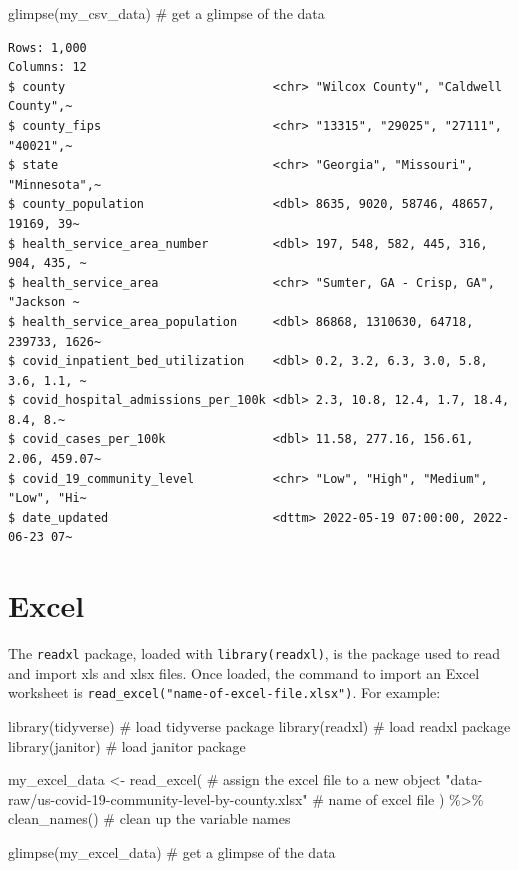 \documentclass[
  letterpaper,
  DIV=11,
  numbers=noendperiod]{scrreprt}
\newenvironment{Shaded}{\begin{snugshade}}{\end{snugshade}}
\newcommand{\CommentTok}[1]{\textcolor[rgb]{0.37,0.37,0.37}{#1}}
\newcommand{\FunctionTok}[1]{\textcolor[rgb]{0.28,0.35,0.67}{#1}}
\newcommand{\NormalTok}[1]{\textcolor[rgb]{0.00,0.23,0.31}{#1}}
\newcommand{\OtherTok}[1]{\textcolor[rgb]{0.00,0.23,0.31}{#1}}
\newcommand{\SpecialCharTok}[1]{\textcolor[rgb]{0.37,0.37,0.37}{#1}}
\newcommand{\StringTok}[1]{\textcolor[rgb]{0.13,0.47,0.30}{#1}}
\begin{document}
\begin{Shaded}
\begin{Highlighting}[]
\FunctionTok{glimpse}\NormalTok{(my\_csv\_data) }\CommentTok{\# get a glimpse of the data }
\end{Highlighting}
\end{Shaded}

\begin{verbatim}
Rows: 1,000
Columns: 12
$ county                             <chr> "Wilcox County", "Caldwell County",~
$ county_fips                        <chr> "13315", "29025", "27111", "40021",~
$ state                              <chr> "Georgia", "Missouri", "Minnesota",~
$ county_population                  <dbl> 8635, 9020, 58746, 48657, 19169, 39~
$ health_service_area_number         <dbl> 197, 548, 582, 445, 316, 904, 435, ~
$ health_service_area                <chr> "Sumter, GA - Crisp, GA", "Jackson ~
$ health_service_area_population     <dbl> 86868, 1310630, 64718, 239733, 1626~
$ covid_inpatient_bed_utilization    <dbl> 0.2, 3.2, 6.3, 3.0, 5.8, 3.6, 1.1, ~
$ covid_hospital_admissions_per_100k <dbl> 2.3, 10.8, 12.4, 1.7, 18.4, 8.4, 8.~
$ covid_cases_per_100k               <dbl> 11.58, 277.16, 156.61, 2.06, 459.07~
$ covid_19_community_level           <chr> "Low", "High", "Medium", "Low", "Hi~
$ date_updated                       <dttm> 2022-05-19 07:00:00, 2022-06-23 07~
\end{verbatim}

\hypertarget{excel}{%
\section{Excel}\label{excel}}

The \texttt{readxl} package, loaded with \texttt{library(readxl)}, is
the package used to read and import xls and xlsx files. Once loaded, the
command to import an Excel worksheet is
\texttt{read\_excel("name-of-excel-file.xlsx")}. For example:

\begin{Shaded}
\begin{Highlighting}[]
\FunctionTok{library}\NormalTok{(tidyverse) }\CommentTok{\# load tidyverse package}
\FunctionTok{library}\NormalTok{(readxl) }\CommentTok{\# load readxl package}
\FunctionTok{library}\NormalTok{(janitor) }\CommentTok{\# load janitor package}

\NormalTok{my\_excel\_data }\OtherTok{\textless{}{-}} \FunctionTok{read\_excel}\NormalTok{( }\CommentTok{\# assign the excel file to a new object}
  \StringTok{"data{-}raw/us{-}covid{-}19{-}community{-}level{-}by{-}county.xlsx"} \CommentTok{\# name of excel file}
\NormalTok{) }\SpecialCharTok{\%\textgreater{}\%}
  \FunctionTok{clean\_names}\NormalTok{() }\CommentTok{\# clean up the variable names}

\FunctionTok{glimpse}\NormalTok{(my\_excel\_data) }\CommentTok{\# get a glimpse of the data}
\end{Highlighting}
\end{Shaded}
\end{document}
